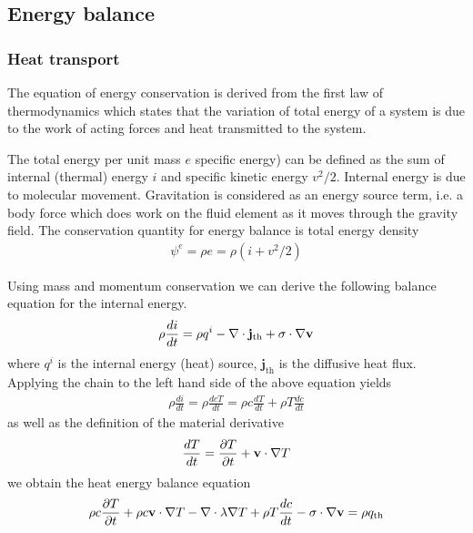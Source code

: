 \subsection{Energy balance}

\subsubsection{Heat transport}

The equation of energy conservation is derived from the first law
of thermodynamics which states that
the variation of total energy of a system is due to the
work of acting forces and heat transmitted to the
system.

The total energy per unit mass $e$ specific
energy) can be defined as the sum of internal (thermal)
energy $i$ and specific kinetic
energy $v^2/2$. Internal energy is due to
molecular movement. Gravitation is considered as an energy source
term, i.e. a body force which does work on the fluid element as it
moves through the gravity field. 
%
The conservation quantity for energy balance is total energy density
%
\begin{eqnarray}
\psi^e = \rho e = \rho(i+v^2/2)
\end{eqnarray}

Using mass and momentum conservation we can derive the following balance equation for the internal energy.
%
\begin{eqnarray}
\rho\frac{di}{dt}
=
\rho q^i
-
\nabla\cdot\mathbf{j}_{\mathrm{th}}
+
\sigma\cdot\nabla\mathbf v
\end{eqnarray}
%
where 
$q^i$ is the internal energy (heat) source, 
$\mathbf{j}_{\mathrm{th}}$ is the diffusive heat flux.
%
Applying the chain to the left hand side of the above equation yields
%
\begin{eqnarray}
\rho\frac{di}{dt}
=
\rho\frac{d cT}{dt}
=
\rho c\frac{d T}{dt}
+
\rho T \frac{d c}{dt}
\end{eqnarray}
%
as well as the definition of the material derivative
%
\begin{eqnarray}
\frac{d T}{dt}
=
\frac{\partial T}{\partial t}
+
\mathbf v\cdot\nabla T
\end{eqnarray}
%
we obtain the heat energy balance equation
%
\begin{eqnarray}
\rho c \frac{\partial T}{\partial t}
+
\rho c \mathbf v\cdot\nabla T
-
\nabla\cdot\lambda\nabla T
+
\rho T \frac{dc}{dt}
-
\sigma\cdot\nabla\mathbf v
= 
\rho q_{\mathrm{th}}
\end{eqnarray}

